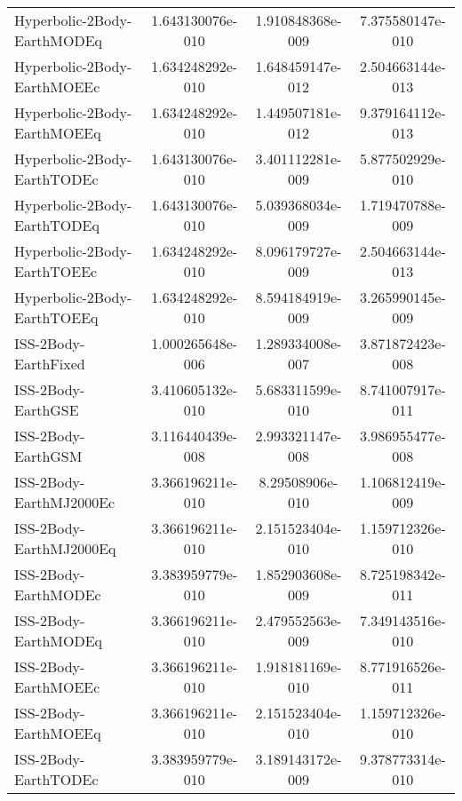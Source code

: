 \begin{table}[htbp!]
\begin{tabular}{lccc}
         Hyperbolic-2Body-EarthMODEq & 1.643130076e-010 & 1.910848368e-009 & 7.375580147e-010 \\
         Hyperbolic-2Body-EarthMOEEc & 1.634248292e-010 & 1.648459147e-012 & 2.504663144e-013 \\
         Hyperbolic-2Body-EarthMOEEq & 1.634248292e-010 & 1.449507181e-012 & 9.379164112e-013 \\
         Hyperbolic-2Body-EarthTODEc & 1.643130076e-010 & 3.401112281e-009 & 5.877502929e-010 \\
         Hyperbolic-2Body-EarthTODEq & 1.643130076e-010 & 5.039368034e-009 & 1.719470788e-009 \\
         Hyperbolic-2Body-EarthTOEEc & 1.634248292e-010 & 8.096179727e-009 & 2.504663144e-013 \\
         Hyperbolic-2Body-EarthTOEEq & 1.634248292e-010 & 8.594184919e-009 & 3.265990145e-009 \\
         ISS-2Body-EarthFixed & 1.000265648e-006 & 1.289334008e-007 & 3.871872423e-008 \\
         ISS-2Body-EarthGSE & 3.410605132e-010 & 5.683311599e-010 & 8.741007917e-011 \\
         ISS-2Body-EarthGSM & 3.116440439e-008 & 2.993321147e-008 & 3.986955477e-008 \\
         ISS-2Body-EarthMJ2000Ec & 3.366196211e-010 & 8.29508906e-010 & 1.106812419e-009 \\
         ISS-2Body-EarthMJ2000Eq & 3.366196211e-010 & 2.151523404e-010 & 1.159712326e-010 \\
         ISS-2Body-EarthMODEc & 3.383959779e-010 & 1.852903608e-009 & 8.725198342e-011 \\
         ISS-2Body-EarthMODEq & 3.366196211e-010 & 2.479552563e-009 & 7.349143516e-010 \\
         ISS-2Body-EarthMOEEc & 3.366196211e-010 & 1.918181169e-010 & 8.771916526e-011 \\
         ISS-2Body-EarthMOEEq & 3.366196211e-010 & 2.151523404e-010 & 1.159712326e-010 \\
         ISS-2Body-EarthTODEc & 3.383959779e-010 & 3.189143172e-009 & 9.378773314e-010 \\

\end{tabular}
\end{table}
